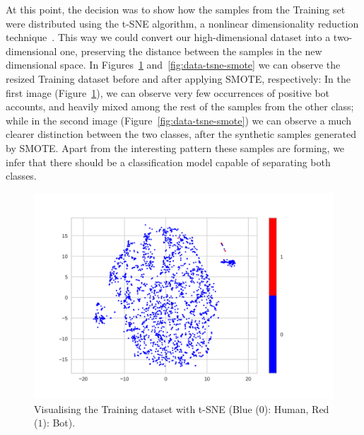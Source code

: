 \documentclass[a4paper, 12pt]{book}
\begin{document}
At this point, the decision was to show how the samples from the Training set were distributed using the t-SNE algorithm, a nonlinear dimensionality reduction technique~\cite{vandermaaten-et-at:t-sne08}. This way we could convert our high-dimensional dataset into a two-dimensional one, preserving the distance between the samples in the new dimensional space. In Figures~\ref{fig:data-tsne} and~\ref{fig:data-tsne-smote} we can observe the resized Training dataset before and after applying SMOTE, respectively: In the first image (Figure~\ref{fig:data-tsne}), we can observe very few occurrences of positive bot accounts, and heavily mixed among the rest of the samples from the other class; while in the second image (Figure~\ref{fig:data-tsne-smote}) we can observe a much clearer distinction between the two classes, after the synthetic samples generated by SMOTE. Apart from the interesting pattern these samples are forming, we infer that there should be a classification model capable of separating both classes.

\begin{figure}
 \centering
  \includegraphics[width=15cm, keepaspectratio]{img/data-tsne.png}
  \caption{Visualising the Training dataset with t-SNE (Blue ($0$): Human, Red ($1$): Bot).}
  \label{fig:data-tsne}
\end{figure}
\end{document}
